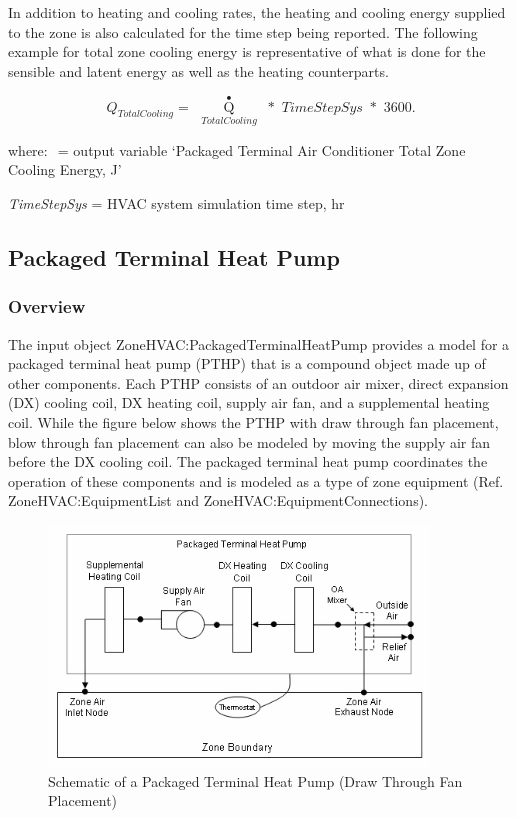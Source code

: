 In addition to heating and cooling rates, the heating and cooling energy supplied to the zone is also calculated for the time step being reported. The following example for total zone cooling energy is representative of what is done for the sensible and latent energy as well as the heating counterparts.

\begin{equation}
\,{Q_{TotalCooling}} = \,\,{\mathop Q\limits^ \bullet_{TotalCooling}}\,\, * \,\,TimeStepSys\,\, * \,\,3600.
\end{equation}

where: \(_{ }\) = output variable `Packaged Terminal Air Conditioner Total Zone Cooling Energy, J'

\emph{TimeStepSys} = HVAC system simulation time step, hr

\subsection{Packaged Terminal Heat Pump}\label{packaged-terminal-heat-pump}

\subsubsection{Overview}\label{overview-7-001}

The input object ZoneHVAC:PackagedTerminalHeatPump provides a model for a packaged terminal heat pump (PTHP) that is a compound object made up of other components. Each PTHP consists of an outdoor air mixer, direct expansion (DX) cooling coil, DX heating coil, supply air fan, and a supplemental heating coil. While the figure below shows the PTHP with draw through fan placement, blow through fan placement can also be modeled by moving the supply air fan before the DX cooling coil. The packaged terminal heat pump coordinates the operation of these components and is modeled as a type of zone equipment (Ref. ZoneHVAC:EquipmentList and ZoneHVAC:EquipmentConnections).

\begin{figure}[hbtp] %
\centering
\includegraphics[width=0.9\textwidth, height=0.9\textheight, keepaspectratio=true]{media/image7215.png}
\caption{  Schematic of a Packaged Terminal Heat Pump (Draw Through Fan Placement) \protect \label{fig:schematic-of-a-packaged-terminal-heat-pump}}
\end{figure}

